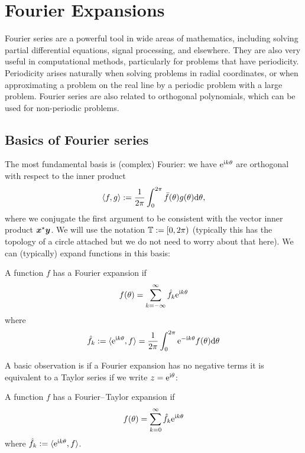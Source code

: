 
\section{Fourier Expansions}
Fourier series are a powerful tool in wide areas of mathematics, including solving partial differential equations, signal processing, and elsewhere. They are also very useful in computational methods, particularly for problems that have periodicity. Periodicity arises naturally when solving problems in radial coordinates, or when approximating a problem on the real line by a periodic problem with a large problem. Fourier series are also related to orthogonal polynomials, which can be used for non-periodic problems.

\subsection{Basics of Fourier series}
The most fundamental basis is (complex) Fourier: we have ${\rm e}^{{\rm i} k \ensuremath{\theta}}$ are orthogonal with respect to the inner product
\[
\ensuremath{\langle}f, g \ensuremath{\rangle} := {1 \over 2\ensuremath{\pi}} \ensuremath{\int}_0^{2\ensuremath{\pi}} \bar f(\ensuremath{\theta}) g(\ensuremath{\theta}) {\rm d}\ensuremath{\theta},
\]
where we conjugate the first argument to be consistent with the vector inner product $\bm{{\mbox{\boldmath$x$\unboldmath}}}^\star \bm{{\mbox{\boldmath$y$\unboldmath}}}$. We will use the notation ${\mathbb T} := [0,2\pi)$ (typically this has the topology of a circle attached but we do not need to worry about that here). We can (typically) expand functions in this basis:

\begin{definition}[Fourier] A function $f$ has a Fourier expansion if
\[
f(\ensuremath{\theta}) = \ensuremath{\sum}_{k = -\ensuremath{\infty}}^\ensuremath{\infty} \hat f_k {\rm e}^{{\rm i} k \ensuremath{\theta}}
\]
where
\[
\hat f_k := \ensuremath{\langle}{\rm e}^{{\rm i} k \ensuremath{\theta}}, f\ensuremath{\rangle} = {1 \over 2\ensuremath{\pi}} \ensuremath{\int}_0^{2\ensuremath{\pi}}  {\rm e}^{-{\rm i} k \ensuremath{\theta}} f(\ensuremath{\theta}) {\rm d}\ensuremath{\theta}
\]
\end{definition}

A basic observation is if a Fourier expansion has no negative terms it is equivalent to a Taylor series if we write $z = {\rm e}^{{\rm i} \ensuremath{\theta}}$:

\begin{definition} A function $f$ has a Fourier\ensuremath{\endash}Taylor expansion if
\[
f(\ensuremath{\theta}) = \ensuremath{\sum}_{k = 0}^\ensuremath{\infty} \hat f_k {\rm e}^{{\rm i} k \ensuremath{\theta}}
\]
where $\hat f_k := \ensuremath{\langle}{\rm e}^{{\rm i} k \ensuremath{\theta}}, f\ensuremath{\rangle}$. \end{definition}

